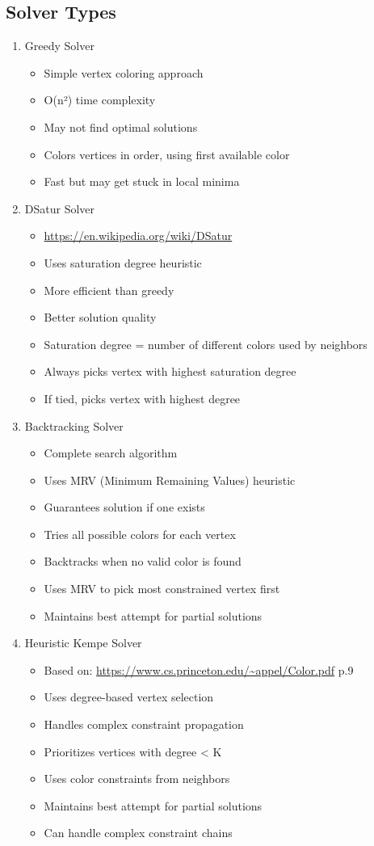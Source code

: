 \documentclass[11pt]{article}
\begin{document}
\subsection{Solver Types}
\label{sec:org1a4782e}
\begin{enumerate}
\item Greedy Solver
\begin{itemize}
\item Simple vertex coloring approach
\item O(n²) time complexity
\item May not find optimal solutions
\item Colors vertices in order, using first available color
\item Fast but may get stuck in local minima
\end{itemize}

\item DSatur Solver
\begin{itemize}
\item \url{https://en.wikipedia.org/wiki/DSatur}
\item Uses saturation degree heuristic
\item More efficient than greedy
\item Better solution quality
\item Saturation degree = number of different colors used by neighbors
\item Always picks vertex with highest saturation degree
\item If tied, picks vertex with highest degree
\end{itemize}

\item Backtracking Solver
\begin{itemize}
\item Complete search algorithm
\item Uses MRV (Minimum Remaining Values) heuristic
\item Guarantees solution if one exists
\item Tries all possible colors for each vertex
\item Backtracks when no valid color is found
\item Uses MRV to pick most constrained vertex first
\item Maintains best attempt for partial solutions
\end{itemize}

\item Heuristic Kempe Solver
\begin{itemize}
\item Based on: \url{https://www.cs.princeton.edu/\~appel/Color.pdf} p.9
\item Uses degree-based vertex selection
\item Handles complex constraint propagation
\item Prioritizes vertices with degree < K
\item Uses color constraints from neighbors
\item Maintains best attempt for partial solutions
\item Can handle complex constraint chains
\end{itemize}
\end{enumerate}
\end{document}
